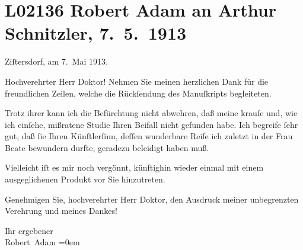 

\section[Robert Adam an Arthur Schnitzler, 7. 5. 1913]{L02136 Robert Adam an Arthur Schnitzler, 7. 5. 1913}
\nopagebreak{}
\rehead{ }\normalsize\beginnumbering{}
\toendnotes[C]{\smallbreak\pagebreak[2]}
\toendnotes[C]{\smallbreak}
\pstart
           \raggedleft{}{\pb}Ziſtersdorf, am 7. Mai 1913. \pend
           
\pstart{}Hochverehrter Herr Doktor!\pend\vspace{0.5em}
\pstart
           Nehmen Sie meinen herzlichen Dank für die freundlichen Zeilen, welche die Rückſendung
               des Manuſkripts
               begleiteten.\pend
           
\pstart
           Trotz ihrer kann ich die Befürchtung nicht abwehren, daß meine krauſe und, wie ich
               einſehe, mißratene Studie Ihren Beifall nicht gefunden habe. Ich begreife ſehr gut,
               daß ſie Ihren Künſtlerſinn, deſſen wunderbare Reife ich zuletzt in der Frau Beate bewundern durfte, geradezu beleidigt
               haben muß.\pend
           
\pstart
           Vielleicht iſt es mir noch vergönnt, künftighin wieder einmal mit einem
               ausgeglichenen Produkt vor Sie hinzutreten.\pend
           
\pstart
           Genehmigen Sie, hochverehrter Herr {\pb}Doktor, den
               Ausdruck meiner unbegrenzten Verehrung und meines Dankes!\pend
           
\pstart
           Ihr ergebener{\\[\baselineskip]}\spacefill\mbox{Robert Adam}\pend
           \leftskip=0em{}\endnumbering{}  
      